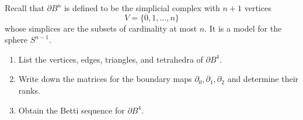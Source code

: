 \documentclass[12 pt, letterpaper]{hmcpset}
\begin{document}
\pagebreak

\begin{problem}[60.]
	Recall that $\partial B^{n}$ is defined to be the simplicial complex with $n + 1$ vertices
	\[
		V = \{ 0, 1, \dots, n \}
	\]
	whose simplices are the subsets of cardinality at most $n$. It is a model for the sphere $S^{n - 1}$.

	\begin{enumerate}
		\item List the vertices, edges, triangles, and tetrahedra of $\partial B^{4}$.

		\item Write down the matrices for the boundary maps $\partial_{0}, \partial_{1}, \partial_{2}$ and determine their ranks.

		\item Obtain the Betti sequence for $\partial B^{4}$.
	\end{enumerate}
\end{problem}
\end{document}

